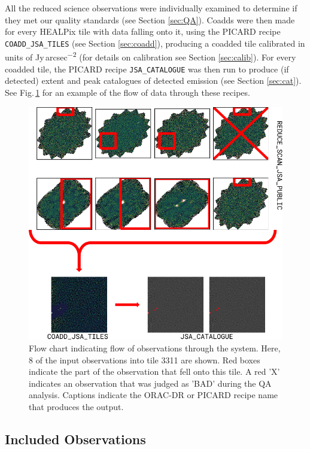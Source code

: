 \documentclass[twocolumn]{aastex6}
\newcommand{\jyas}{Jy\,arcsec\textsuperscript{$-$2}}
\begin{document}
All the reduced science observations were individually examined to
determine if they met our quality standards (see Section
\ref{sec:QA}). Coadds were then made for every HEALPix tile with data
falling onto it, using the PICARD recipe \texttt{COADD\_JSA\_TILES}
(see Section \ref{sec:coadd}), producing a coadded tile calibrated in
units of \jyas{} (for details on calibration see Section
\ref{sec:calib}). For every coadded tile, the PICARD recipe
\texttt{JSA\_CATALOGUE} was then run to produce (if detected) extent
and peak catalogues of detected emission (see Section
\ref{sec:cat}). See Fig.\,\ref{fig:flowchart} for an example of
the flow of data through these recipes.

\begin{figure}
  \centering
  \includegraphics[width=1.0\linewidth]{flowchart}
  \caption{Flow chart indicating flow of observations through the
    system. Here, 8 of the input observations into tile 3311 are
    shown. Red boxes indicate the part of the observation that fell
    onto this tile. A red 'X' indicates an observation that was judged
    as 'BAD' during the QA analysis. Captions indicate the ORAC-DR or
    PICARD recipe name that produces the output.}
  \label{fig:flowchart}
\end{figure}

\subsection{Included Observations}
\end{document}
